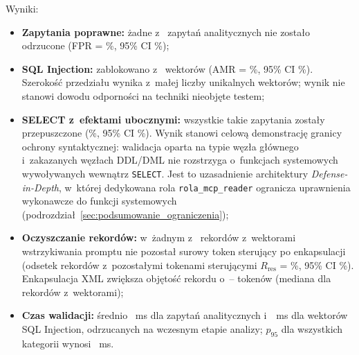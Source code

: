 \begin{table}[htbp]
\centering
\small
\caption[Ewaluacja bezpieczeństwa modułu SQL Sanitizer]{Wyniki ewaluacji modułu SQL Sanitizer i~enkapsulacji rekordów na \wynSecTotal{} unikalnych wektorach (95\% CI Cloppera--Pearsona; średni czas walidacji [ms])}
\label{tab:security_evaluation_results}
\end{table}

Wyniki:
\begin{itemize}
    \item \textbf{Zapytania poprawne:} żadne z~\wynSecAnalytic{} zapytań analitycznych nie zostało odrzucone (FPR = \wynFpr\%, 95\% CI \wynFprCi\%);
    \item \textbf{SQL Injection:} zablokowano \wynAmrK{} z~\wynSecInjection{} wektorów (AMR = \wynAmr\%, 95\% CI \wynAmrCi\%). Szerokość przedziału wynika z~małej liczby unikalnych wektorów; wynik nie stanowi dowodu odporności na techniki nieobjęte testem;
    \item \textbf{SELECT z~efektami ubocznymi:} wszystkie \wynSideK{} takie zapytania zostały przepuszczone (\wynSide\%, 95\% CI \wynSideCi\%). Wynik stanowi celową demonstrację granicy ochrony syntaktycznej: walidacja oparta na typie węzła głównego i~zakazanych węzłach DDL/DML nie rozstrzyga o~funkcjach systemowych wywoływanych wewnątrz \texttt{SELECT}. Jest to uzasadnienie architektury \emph{Defense-in-Depth}, w~której dedykowana rola \texttt{rola\_mcp\_reader} ogranicza uprawnienia wykonawcze do funkcji systemowych (podrozdział~\ref{sec:podsumowanie_ograniczenia});
    \item \textbf{Oczyszczanie rekordów:} w~żadnym z~\wynSecPrompt{} rekordów z~wektorami wstrzykiwania promptu nie pozostał surowy token sterujący po enkapsulacji (odsetek rekordów z~pozostałymi tokenami sterującymi $R_{\text{res}}$ = \wynResid\%, 95\% CI \wynResidCi\%). Enkapsulacja XML zwiększa objętość rekordu o~\wynXmlMin--\wynXmlMax{} tokenów (mediana \wynXmlMedPi{} dla rekordów z~wektorami);
    \item \textbf{Czas walidacji:} średnio \wynLatAnalytic~ms dla zapytań analitycznych i~\wynLatInjection~ms dla wektorów SQL Injection, odrzucanych na wczesnym etapie analizy; $p_{95}$ dla wszystkich kategorii wynosi \wynLatPpp~ms.
\end{itemize}

